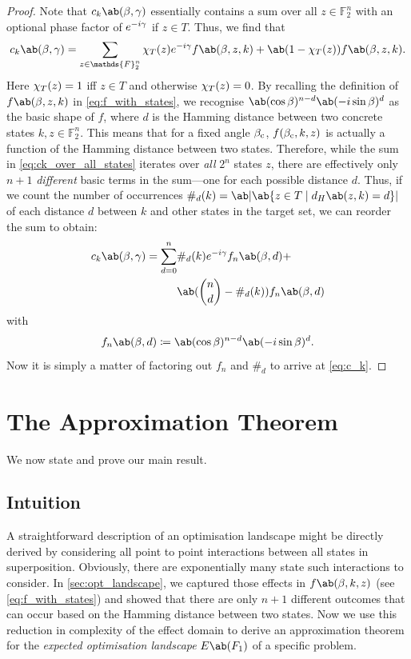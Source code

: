 \begin{proof}
    Note that $c_k\ab(\mangle,\pangle)$ essentially contains a sum over all $z \in \mathds{F}_2^n$ with an optional phase factor of $e^{-i \gamma}$ if $z \in T$. Thus, we find that
    \begin{equation}
        \label{eq:ck_over_all_states}
    c_k\ab(\mangle,\pangle) = \sum_{z \in \mathds{F}_2^n} \ind_T(z) e^{-i \pangle} f\ab(\mangle, z, k) + \ab(1 - \ind_T(z)) f\ab(\mangle, z, k).
    \end{equation}
    Here $\chi_T(z) = 1$ iff $z \in T$ and otherwise $\chi_T(z) = 0$. By recalling the definition of $f\ab(\mangle, z, k)$ in \cref{eq:f_with_states}, we recognise $\ab(\cos \mangle)^{n - d} \ab(-i \sin \mangle)^d$ as the basic shape of $f$, where $d$ is the Hamming distance between two concrete states $k,z \in \mathds{F}_2^n$. This means that for a fixed angle $\beta_{\text{c}}$, $f(\beta_{\text{c}}, k, z)$ is actually a function of the Hamming distance between two states. Therefore, while the sum in \cref{eq:ck_over_all_states} iterates over \emph{all} $2^n$ states $z$, there are effectively only $n+1$ \emph{different} basic terms in the sum---one for each possible distance $d$. Thus, if we count the number of occurrences $\#_d (k) = \ab|\ab\{z \in T \mid d_H\ab(z,k) = d \}|$ of each distance $d$ between $k$ and other states in the target set, we can reorder the sum to obtain:
  \begin{align*}
      c_k\ab(\mangle,\pangle) = \sum_{d = 0}^n &\#_d (k) e^{-i \pangle} f_n \ab(\mangle, d) + \\
      &\ab(\binom{n}{d} - \#_d (k)) f_n \ab(\mangle, d)
  \end{align*}
  with 
  \begin{equation}
    f_n \ab(\mangle, d) \coloneqq \ab(\cos \mangle)^{n - d} \ab(-i \sin \mangle)^d.
  \end{equation}
    Now it is simply a matter of factoring out $f_n$ and $\#_d$ to arrive at \cref{eq:c_k}.
\end{proof}

\section{The \QAOA Approximation Theorem}\label{sec:approx_thm}
We now state and prove our main result.

\subsection{Intuition}
A straightforward description of an optimisation landscape might be directly derived by considering all point to point interactions between all states in superposition. Obviously, there are exponentially many state such interactions to consider. In \cref{sec:opt_landscape}, we captured those effects in $f\ab(\mangle, k, z)$ (see \cref{eq:f_with_states}) and showed that there are only $n + 1$ different outcomes that can occur based on the Hamming distance between two states. Now we use this reduction in complexity of the effect domain to derive an approximation theorem for the \emph{expected optimisation landscape} $E\ab(F_1)$ of a specific problem. 
 
